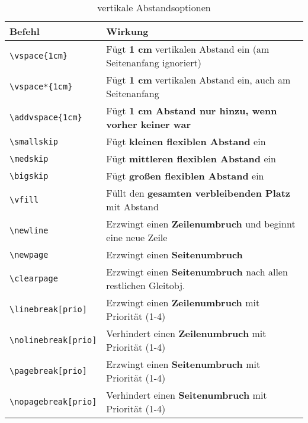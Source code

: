 \begin{table}[H]
    \centering
    \begin{tabular}{lp{10cm}}
        \toprule
        \textbf{Befehl}                           & \textbf{Wirkung}                                                      \\
        \midrule
        \texttt{\textbackslash vspace\{1cm\}}     & Fügt \textbf{1 cm} vertikalen Abstand ein (am Seitenanfang ignoriert) \\
        \texttt{\textbackslash vspace*\{1cm\}}    & Fügt \textbf{1 cm} vertikalen Abstand ein, auch am Seitenanfang       \\
        \texttt{\textbackslash addvspace\{1cm\}}  & Fügt \textbf{1 cm Abstand nur hinzu, wenn vorher keiner war}          \\
        \texttt{\textbackslash smallskip}         & Fügt \textbf{kleinen flexiblen Abstand} ein                           \\
        \texttt{\textbackslash medskip}           & Fügt \textbf{mittleren flexiblen Abstand} ein                         \\
        \texttt{\textbackslash bigskip}           & Fügt \textbf{großen flexiblen Abstand} ein                            \\
        \texttt{\textbackslash vfill}             & Füllt den \textbf{gesamten verbleibenden Platz} mit Abstand           \\
        \midrule
        \texttt{\textbackslash newline}           & Erzwingt einen \textbf{Zeilenumbruch} und beginnt eine neue Zeile     \\
        \texttt{\textbackslash newpage}           & Erzwingt einen \textbf{Seitenumbruch}                                 \\
        \texttt{\textbackslash clearpage}         & Erzwingt einen \textbf{Seitenumbruch} nach allen restlichen Gleitobj. \\
        \texttt{\textbackslash linebreak[prio]}   & Erzwingt einen \textbf{Zeilenumbruch} mit Priorität (1-4)             \\
        \texttt{\textbackslash nolinebreak[prio]} & Verhindert einen \textbf{Zeilenumbruch} mit Priorität (1-4)           \\
        \texttt{\textbackslash pagebreak[prio]}   & Erzwingt einen \textbf{Seitenumbruch} mit Priorität (1-4)             \\
        \texttt{\textbackslash nopagebreak[prio]} & Verhindert einen \textbf{Seitenumbruch} mit Priorität (1-4)           \\
        \bottomrule
    \end{tabular}
    \caption{vertikale Abstandsoptionen}
    \label{tab:vertikale_abstaende}
\end{table}